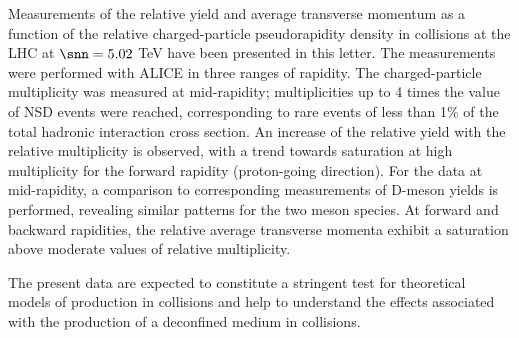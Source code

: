 
Measurements of the relative \jpsi yield and average transverse momentum as a function of the relative charged-particle pseudorapidity density in \ppb collisions at the LHC at $\snn = 5.02$ TeV have been presented in this letter.
The measurements were performed with ALICE in three ranges of rapidity. The charged-particle multiplicity was measured at mid-rapidity; multiplicities up to 4 times the value of NSD events were reached, corresponding to rare events of less than 1\% of the total hadronic interaction cross section.
An increase of the relative \jpsi yield with the relative multiplicity is observed, with a trend towards saturation at high multiplicity for the forward rapidity (proton-going direction). 
For the \jpsi data at mid-rapidity, a comparison to corresponding measurements of D-meson yields is performed, revealing similar patterns for the two meson species.
At forward and backward rapidities, the relative average transverse momenta exhibit a saturation above moderate values of relative multiplicity.

The present data are expected to constitute a stringent test for theoretical models of \jpsi production in \mbox{\ppb} collisions and help to understand the effects associated with the production of a deconfined medium in \pb collisions. 



